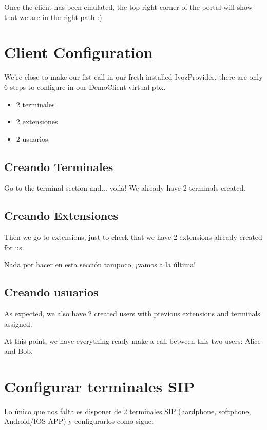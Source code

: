 \documentclass[letterpaper,10pt,spanish]{sphinxmanual}
\begin{document}
Once the client has been emulated, the top right corner of the portal will
show that we are in the right path :)


\section{Client Configuration}
\label{getting_started/internal_calls/client_portal:client-configuration}\label{getting_started/internal_calls/client_portal::doc}\label{getting_started/internal_calls/client_portal:id1}
We're close to make our fist call in our fresh installed IvozProvider, there
are only 6 steps to configure in our DemoClient virtual pbx.
\begin{itemize}
\item {} 
2 terminales

\item {} 
2 extensiones

\item {} 
2 usuarios

\end{itemize}


\subsection{Creando Terminales}
\label{getting_started/internal_calls/client_portal:creating-terminals}
Go to the terminal section and... voilà! We already have 2 terminals created.


\subsection{Creando Extensiones}
\label{getting_started/internal_calls/client_portal:creating-extensions}
Then we go to extensions, just to check that we have 2 extensions already
created for us.

Nada por hacer en esta sección tampoco, ¡vamos a la última!


\subsection{Creando usuarios}
\label{getting_started/internal_calls/client_portal:creating-users}
As expected, we also have 2 created users with previous extensions and terminals assigned.

At this point, we have everything ready make a call between this two users: Alice and Bob.


\section{Configurar terminales SIP}
\label{getting_started/internal_calls/configure_sipuacs:sip-terminal-configuration}\label{getting_started/internal_calls/configure_sipuacs::doc}
Lo único que nos falta es disponer de 2 terminales SIP (hardphone, softphone, Android/IOS APP) y configurarlos como sigue:
\end{document}
